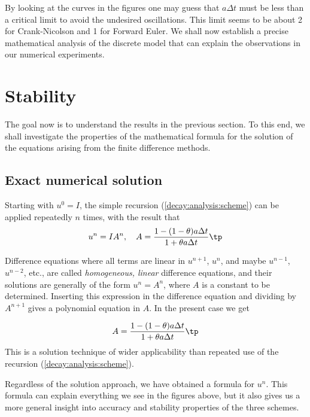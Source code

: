 \documentclass[graybox,sectrefs,envcountresetchap,open=right,final]{svmonodo}
\newenvironment{notice_mdfboxadmon}[1][]{
\begin{notice_mdfboxmdframed}[frametitle=#1]
}
{
\end{notice_mdfboxmdframed}
}
\begin{document}
By looking at the curves in the figures one may guess that $a\Delta t$
must be less than a critical limit to avoid the undesired
oscillations.  This limit seems to be about 2 for Crank-Nicolson and 1
for Forward Euler.  We shall now establish a precise mathematical
analysis of the discrete model that can explain the observations in
our numerical experiments.


\section{Stability}

The goal now is to understand the results in the previous section.
To this end, we shall investigate the properties of the mathematical
formula for the solution of the equations arising from the finite
difference methods.

\subsection{Exact numerical solution}

Starting with $u^0=I$, the simple recursion (\ref{decay:analysis:scheme})
can be applied repeatedly $n$ times, with the result that
\begin{equation}
u^{n} = IA^n,\quad A = \frac{1 - (1-\theta) a\Delta t}{1 + \theta a\Delta t}\tp
\label{decay:analysis:unex}
\end{equation}


\begin{notice_mdfboxadmon}
Difference equations where all terms are linear in
$u^{n+1}$, $u^n$, and maybe $u^{n-1}$, $u^{n-2}$, etc., are
called \emph{homogeneous, linear} difference equations, and their solutions
are generally of the form $u^n=A^n$, where $A$ is a constant to be
determined. Inserting this expression in the difference equation
and dividing by $A^{n+1}$ gives
a polynomial equation in $A$. In the present case we get

\[ A = \frac{1 - (1-\theta) a\Delta t}{1 + \theta a\Delta t}\tp \]
This is a solution technique of wider applicability than repeated use of
the recursion (\ref{decay:analysis:scheme}).
\end{notice_mdfboxadmon}



Regardless of the solution approach, we have obtained a formula for
$u^n$.  This formula can explain everything we see in the figures
above, but it also gives us a more general insight into accuracy and
stability properties of the three schemes.
\end{document}
